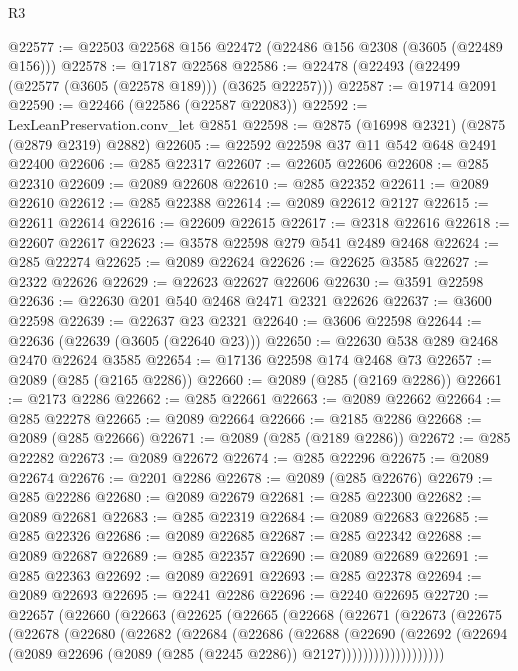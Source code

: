 \begin{lexlean}{R3}
\begin{coremodule}
@22577 := @22503 @22568 @156 @22472 (@22486 @156 @2308 (@3605 (@22489 @156)))
@22578 := @17187 @22568
@22586 := @22478 (@22493 (@22499 (@22577 (@3605 (@22578 @189))) (@3625 @22257)))
@22587 := @19714 @2091
@22590 := @22466 (@22586 (@22587 @22083))
@22592 := LexLeanPreservation.conv_let @2851
@22598 := @2875 (@16998 @2321) (@2875 (@2879 @2319) @2882)
@22605 := @22592 @22598 @37 @11 @542 @648 @2491 @22400
@22606 := @285 @22317
@22607 := @22605 @22606
@22608 := @285 @22310
@22609 := @2089 @22608
@22610 := @285 @22352
@22611 := @2089 @22610
@22612 := @285 @22388
@22614 := @2089 @22612 @2127
@22615 := @22611 @22614
@22616 := @22609 @22615
@22617 := @2318 @22616
@22618 := @22607 @22617
@22623 := @3578 @22598 @279 @541 @2489 @2468
@22624 := @285 @22274
@22625 := @2089 @22624
@22626 := @22625 @3585
@22627 := @2322 @22626
@22629 := @22623 @22627 @22606
@22630 := @3591 @22598
@22636 := @22630 @201 @540 @2468 @2471 @2321 @22626
@22637 := @3600 @22598
@22639 := @22637 @23 @2321
@22640 := @3606 @22598
@22644 := @22636 (@22639 (@3605 (@22640 @23)))
@22650 := @22630 @538 @289 @2468 @2470 @22624 @3585
@22654 := @17136 @22598 @174 @2468 @73
@22657 := @2089 (@285 (@2165 @2286))
@22660 := @2089 (@285 (@2169 @2286))
@22661 := @2173 @2286
@22662 := @285 @22661
@22663 := @2089 @22662
@22664 := @285 @22278
@22665 := @2089 @22664
@22666 := @2185 @2286
@22668 := @2089 (@285 @22666)
@22671 := @2089 (@285 (@2189 @2286))
@22672 := @285 @22282
@22673 := @2089 @22672
@22674 := @285 @22296
@22675 := @2089 @22674
@22676 := @2201 @2286
@22678 := @2089 (@285 @22676)
@22679 := @285 @22286
@22680 := @2089 @22679
@22681 := @285 @22300
@22682 := @2089 @22681
@22683 := @285 @22319
@22684 := @2089 @22683
@22685 := @285 @22326
@22686 := @2089 @22685
@22687 := @285 @22342
@22688 := @2089 @22687
@22689 := @285 @22357
@22690 := @2089 @22689
@22691 := @285 @22363
@22692 := @2089 @22691
@22693 := @285 @22378
@22694 := @2089 @22693
@22695 := @2241 @2286
@22696 := @2240 @22695
@22720 := @22657
    (@22660
      (@22663
        (@22625
          (@22665
            (@22668
              (@22671
                (@22673
                  (@22675
                    (@22678
                      (@22680
                        (@22682
                          (@22684
                            (@22686
                              (@22688
                                (@22690
                                  (@22692
                                    (@22694
                                      (@2089
                                        @22696
                                        (@2089 (@285 (@2245 @2286)) @2127)))))))))))))))))))

\end{coremodule}
\end{lexlean}
